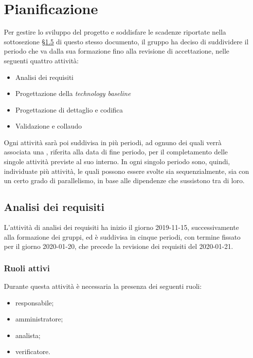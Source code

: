 \section{Pianificazione}

	Per gestire lo sviluppo del progetto e soddisfare le scadenze riportate nella sottosezione \hyperref[riferimento_scadenze]{\S1.5} di questo stesso documento, il gruppo ha deciso di suddividere il periodo che va dalla sua formazione fino alla revisione di accettazione, nelle seguenti quattro attività:
	\begin{itemize}
		\item Analisi dei requisiti
		\item Progettazione della \textit{technology baseline}
		\item Progettazione di dettaglio e codifica
		\item Validazione e collaudo
	\end{itemize}
	Ogni attività sarà poi suddivisa in più periodi, ad ognuno dei quali verrà associata una , riferita alla data di fine periodo, per il completamento delle singole attività previste al suo interno. In ogni singolo periodo sono, quindi, individuate più attività, le quali possono essere svolte sia sequenzialmente, sia con un certo grado di parallelismo, in base alle dipendenze che sussistono tra di loro.
	
	\subsection{Analisi dei requisiti}
	
		L'attività di analisi dei requisiti ha inizio il giorno 2019-11-15, successivamente alla formazione dei gruppi, ed è suddivisa in cinque periodi, con termine fissato per il giorno 2020-01-20, che precede la revisione dei requisiti del 2020-01-21.
		
		\subsubsection{Ruoli attivi}
		
			Durante questa attività è necessaria la presenza dei seguenti ruoli:
			\begin{itemize}
				\item responsabile;
				\item amministratore;
				\item analista;
				\item verificatore.
			\end{itemize}
		
